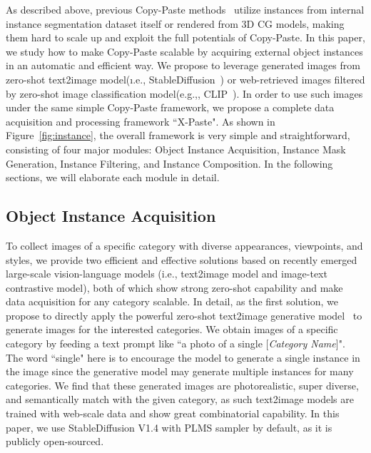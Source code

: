 \documentclass{article}
\newcommand{\eg}{e.g.,}
\begin{document}
As described above, previous Copy-Paste methods~\cite{Copy-Paste, Simple-Copy-Paste, Contextual-Copy-Paste} utilize instances from internal instance segmentation dataset itself or rendered from 3D CG models, making them hard to scale up and exploit the full potentials of Copy-Paste. In this paper, we study how to make Copy-Paste scalable by acquiring external object instances in an automatic and efficient way. We propose to leverage generated images from zero-shot text2image model(\i.e., StableDiffusion~\cite{ldm}) or web-retrieved images filtered by zero-shot image classification model(\eg, CLIP~\cite{CLIP}). In order to use such images under the same simple Copy-Paste framework, we propose a complete data acquisition and processing framework ``X-Paste". As shown in Figure~\ref{fig:instance}, the overall framework is very simple and straightforward, consisting of four major modules: Object Instance Acquisition, Instance Mask Generation, Instance Filtering, and Instance Composition. In the following sections, we will elaborate each module in detail.
 


\subsection{Object Instance Acquisition}
\label{sec:method1}
To collect images of a specific category with diverse appearances, viewpoints, and styles, we provide two efficient and effective solutions based on recently emerged large-scale vision-language models (i.e., text2image model and image-text contrastive model), both of which show strong zero-shot capability and make data acquisition for any category scalable. In detail, as the first solution, we propose to directly apply the powerful zero-shot text2image generative model~\cite{ldm} to generate images for the interested categories. We obtain images of a specific category by feeding a text prompt like ``a photo of a single [\textit{Category Name}]". The word ``single" here is to encourage the model to generate a single instance in the image since the generative model may generate multiple instances for many categories. We find that these generated images are photorealistic, super diverse, and semantically match with the given category, as such text2image models are trained with web-scale data and show great combinatorial capability. In this paper, we use StableDiffusion V1.4 with PLMS sampler by default, as it is publicly open-sourced.
\end{document}
